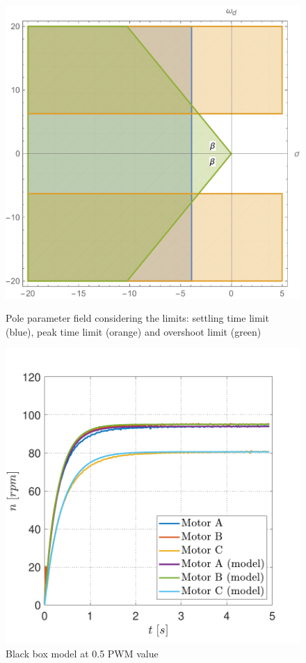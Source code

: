 \documentclass[12pt,english,twoside]{article}
\begin{document}
\begin{figure}[htb!]
	\centering
	\centering
	\includegraphics[width=\textwidth]{figures/possible_poles}
	\caption{Pole parameter field considering the limits: settling time limit (blue), peak time limit (orange) and overshoot limit (green)}
	\label{possible_poles}
	\endminipage\hfill
	\centering
	\includegraphics[width=\textwidth]{figures/directed_speed_pwm_50_fitted}
	\caption{Black box model at 0.5 PWM value}
	\label{fitted_model}
	\endminipage\hfill
\end{figure}
\end{document}
